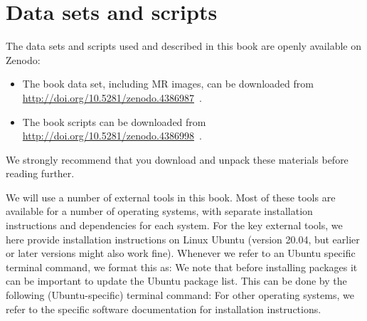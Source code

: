 \section{Data sets and scripts}

The data sets and scripts used and described in this book are openly
available on Zenodo:
\begin{itemize}
\item
  The book data set, including MR images, can be downloaded from \\
  \url{http://doi.org/10.5281/zenodo.4386987}~\cite{kent_andre_mardal_2020_4386987}.
\item
  The book scripts can be downloaded from \\
  \url{http://doi.org/10.5281/zenodo.4386998}~\cite{kent_andre_mardal_2020_4386999}.
\end{itemize}
 We strongly recommend that you download and unpack these materials before
 reading further.

We will use a number of external tools in this book. Most of these
tools are available for a number of operating systems, with separate
installation instructions and dependencies for each system. For the
key external tools, we here provide installation instructions on Linux
Ubuntu (version 20.04, but earlier or later versions might also work
fine). Whenever we refer to an Ubuntu specific terminal command, we
format this as:
\noindent We note that before installing packages it can be important to update
the Ubuntu package list. This can be done by the following (Ubuntu-specific)
terminal command:
\noindent For other operating systems, we refer to the specific
software documentation for installation instructions.






